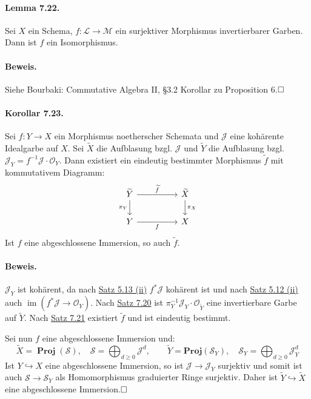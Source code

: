 \documentclass[11pt,b5paper,openany]{memoir}
\def \qed {$\hfill\square$}
\begin{document}
\paragraph{Lemma 7.22.}\label{7.22} Sei $X$ ein Schema, $f:\mathcal{L}\to\mathcal{M}$ ein surjektiver Morphismus invertierbarer Garben. Dann ist $f$ ein Isomorphismus.

\paragraph{Beweis.} Siehe Bourbaki: Commutative Algebra II, §3.2 Korollar zu Proposition 6.\qed

\paragraph{Korollar 7.23.}\label{7.23} Sei $f:Y\to X$ ein Morphismus noetherscher Schemata und $\mathcal{J}$ eine kohärente Idealgarbe auf $X$. Sei $\widetilde{X}$ die Aufblasung bzgl. $\mathcal{J}$ und $\widetilde{Y}$ die Aufblasung bzgl. $\mathcal{J}_Y=f^{-1}\mathcal{J}\cdot\mathcal{O}_Y$. Dann existiert ein eindeutig bestimmter Morphismus $\widetilde{f}$ mit kommutativem Diagramm:
\[\begin{tikzcd}
\widetilde{Y}\ar[rr, "\widetilde{f}"]\dar["\pi_Y"'] && \widetilde{X}\dar["\pi_X"]\\
Y\ar[rr, "f"'] && X
\end{tikzcd}\]
Ist $f$ eine abgeschlossene Immersion, so auch $\widetilde{f}$.

\paragraph{Beweis.} $\mathcal{J}_Y$ ist kohärent, da nach \hyperref[5.13]{Satz 5.13 (ii)} $f^\ast\mathcal{J}$ kohärent ist und nach \hyperref[5.12]{Satz 5.12 (ii)} auch $\operatorname{im}(f^\ast\mathcal{J}\to\mathcal{O}_Y)$. Nach \hyperref[7.20]{Satz 7.20} ist $\pi_Y^{-1}\mathcal{J}_Y\cdot\mathcal{O}_{\widetilde{Y}}$ eine invertierbare Garbe auf $\widetilde{Y}$. Nach \hyperref[7.21]{Satz 7.21} existiert $\widetilde{f}$ und ist eindeutig bestimmt.

Sei nun $f$ eine abgeschlossene Immersion und:
\[\widetilde{X}=\operatorname{\mathbf{Proj}}(\mathcal{S}),\quad \mathcal{S}=\bigoplus_{d\geq 0}\mathcal{J}^d,\qquad\widetilde{Y}=\mathbf{Proj}(\mathcal{S}_Y),\quad\mathcal{S}_Y=\bigoplus_{d\geq 0}\mathcal{J}_Y^d \]
Ist $Y\hookrightarrow X$ eine abgeschlossene Immersion, so ist $\mathcal{J}\to\mathcal{J}_Y$ surjektiv und somit ist auch $\mathcal{S}\to\mathcal{S}_Y$ als Homomorphismus graduierter Ringe surjektiv. Daher ist $\widetilde{Y}\hookrightarrow\widetilde{X}$ eine abgeschlossene Immersion.\qed
\end{document}
